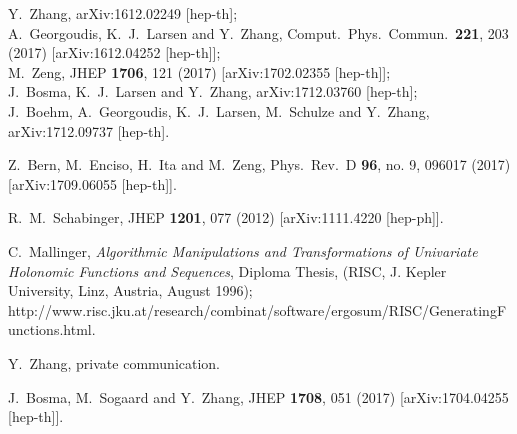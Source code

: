 \documentclass[aps,prd,preprint,groupedaddress,nofootinbib,showpacs,eqsecnum]{revtex4}
\begin{document}
\begin{thebibliography}{99}
Y.~Zhang,
arXiv:1612.02249 [hep-th];\\
A.~Georgoudis, K.~J.~Larsen and Y.~Zhang,
Comput.\ Phys.\ Commun.\  {\bf 221}, 203 (2017)
[arXiv:1612.04252 [hep-th]];\\
M.~Zeng,
JHEP {\bf 1706}, 121 (2017)
[arXiv:1702.02355 [hep-th]];\\
J.~Bosma, K.~J.~Larsen and Y.~Zhang,
arXiv:1712.03760 [hep-th];\\
J.~Boehm, A.~Georgoudis, K.~J.~Larsen, M.~Schulze and Y.~Zhang,
arXiv:1712.09737 [hep-th].

Z.~Bern, M.~Enciso, H.~Ita and M.~Zeng,
Phys.\ Rev.\ D {\bf 96}, no. 9, 096017 (2017)
[arXiv:1709.06055 [hep-th]].

R.~M.~Schabinger,
JHEP {\bf 1201}, 077 (2012)
[arXiv:1111.4220 [hep-ph]].

C.~Mallinger, \textit{Algorithmic Manipulations and Transformations of Univariate
Holonomic Functions and Sequences\/}, Diploma Thesis, (RISC, J. Kepler University,
Linz, Austria, August 1996);
\textsf{http://www.risc.jku.at/research/combinat/software/ergosum/RISC/GeneratingFunctions.html}.

Y.~Zhang, private communication.

J.~Bosma, M.~Sogaard and Y.~Zhang,
JHEP {\bf 1708}, 051 (2017)
[arXiv:1704.04255 [hep-th]].



\end{thebibliography}
\end{document}
